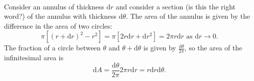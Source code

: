 \documentclass[../multivariate_calculus.tex]{subfiles}
\begin{document}
        \paragraph{}
        Consider an annulus of thickness $\mathrm{d}r$ and consider a section (is this the right word?) of the annulus with thickness $\mathrm{d}\theta$.
        The area of the annulus is given by the difference in the area of two circles:
        \begin{equation}
            \pi[(r+\mathrm{d}r)^2-r^2]=\pi[2r\mathrm{d}r+\mathrm{d}r^2]=2\pi r\mathrm{d}r\text{ as }\mathrm{d}r\to 0.
        \end{equation}
        The fraction of a circle between $\theta$ and $\theta+\mathrm{d}\theta$ is given by $\frac{\mathrm{d}\theta}{2\pi}$, so the area of the infinitesimal area is
        \begin{equation}
            \mathrm{d}A=\frac{\mathrm{d}\theta}{2\pi}2\pi r\mathrm{d}r=r\mathrm{d}r\mathrm{d}\theta.
        \end{equation}
\end{document}
